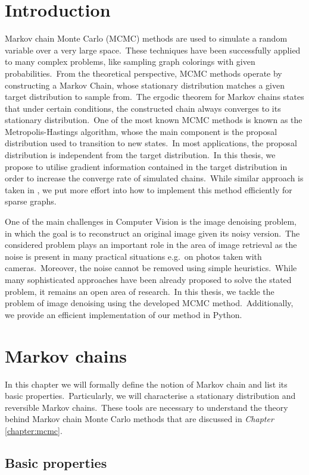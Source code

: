 \documentclass[shortabstract, english, lic]{iithesis}
\author         {Dawid Wegner}
\date           {29 sierpnia 2021}
\newcommand\numberedchapter[1]{\setlength\topskip{3cm}\chapter{#1}\setlength\topskip{0cm}}
\theoremstyle{default_theorem_style}\newtheorem{theorem}{Theorem}
\theoremstyle{default_theorem_style}\newtheorem{definition}{Definition}
\begin{document}
\numberedchapter{Introduction}

Markov chain Monte Carlo (MCMC) methods are used to simulate a random variable over a very large space.\ These
techniques have been successfully applied to many complex problems, like sampling graph colorings with given
probabilities.\ From the theoretical perspective, MCMC methods operate by constructing a Markov Chain, whose
stationary distribution matches a given target distribution to sample from.\ The ergodic theorem for Markov chains
states that under certain conditions, the constructed chain always converges to its stationary distribution.\ One
of the most known MCMC methods is known as the Metropolis-Hastings algorithm, whose the main component is the proposal
distribution used to transition to new states.\ In most applications, the proposal distribution is independent from
the target distribution.\ In this thesis, we propose to utilise gradient information contained in the target
distribution in order to increase the converge rate of simulated chains.\ While similar approach is taken in
\cite{oops_gradient}, we put more effort into how to implement this method efficiently for sparse graphs.\newline

\noindent One of the main challenges in Computer Vision is the image denoising problem, in which the goal is to
reconstruct an original image given its noisy version.\ The considered problem plays an important role in the area
of image retrieval as the noise is present in many practical situations e.g.\ on photos taken with cameras.\ Moreover,
the noise cannot be removed using simple heuristics.\ While many sophisticated approaches have been already proposed
to solve the stated problem, it remains an open area of research.\ In this thesis, we tackle the problem of image
denoising using the developed MCMC method.\ Additionally, we provide an efficient implementation of our
method in Python.

\numberedchapter{Markov chains}

In this chapter we will formally define the notion of Markov chain and list its basic properties.\ Particularly,
we will characterise a stationary distribution and reversible Markov chains.\ These tools are necessary to understand
the theory behind Markov chain Monte Carlo methods that are discussed in \textit{Chapter} \ref{chapter:mcmc}.

\section{Basic properties}
\end{document}
